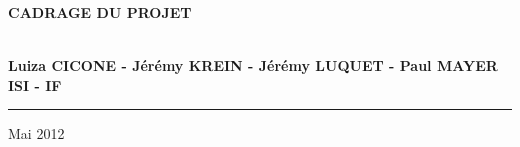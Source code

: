 \documentclass[a4paper,11px]{article}
\begin{document}
\begin{titlepage}
\begin{center}
\begin{center}
{\Huge \bf CADRAGE DU PROJET}


\end{center}


\vspace{1cm}

\begin{center}
$ $\\
\large{ \textbf{Luiza CICONE - Jérémy KREIN - Jérémy LUQUET - Paul MAYER}}\\
\large{ \textbf{ISI - IF}}
$ $\\
\end{center}
\rule{\linewidth}{.5pt}


\vfill


{\large Mai 2012}

\end{center}
\end{titlepage}


\newpage


%
\newenvironment{myenumerate}{%
  \edef\backupindent{\the\parindent}%
  \enumerate%
  \setlength{\parindent}{\backupindent}%
}{\endenumerate}

%

\renewcommand{\appendixtocname}{Annexes}


\end{document}
